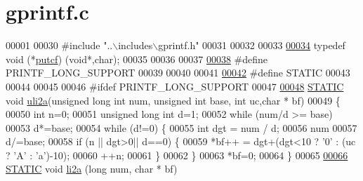 \hypertarget{a00043_source}{\section{gprintf.\+c}
\label{a00043_source}
}

\begin{DoxyCode}
00001 
00030 \textcolor{preprocessor}{#include "..\(\backslash\)includes\(\backslash\)gprintf.h"}
00031 
00032 
00033 
\hypertarget{a00043_source_l00034}{}\hyperlink{a00043_aa2de12079c58c63cb0208a0b3df2a0b7}{00034} \textcolor{keyword}{typedef} void (*\hyperlink{a00043_aa2de12079c58c63cb0208a0b3df2a0b7}{putcf}) (\textcolor{keywordtype}{void}*,char);
00035 
00036 
00037 
\hypertarget{a00043_source_l00038}{}\hyperlink{a00043_ac346309c454e31a36e32039d9575ee3e}{00038} \textcolor{preprocessor}{#define PRINTF\_LONG\_SUPPORT}
00039 
00040 
00041 
\hypertarget{a00043_source_l00042}{}\hyperlink{a00043_a10b2d890d871e1489bb02b7e70d9bdfb}{00042} \textcolor{preprocessor}{#define STATIC }
00043 
00044 
00045 
00046 \textcolor{preprocessor}{#ifdef PRINTF\_LONG\_SUPPORT}
00047 
\hypertarget{a00043_source_l00048}{}\hyperlink{a00043_ac8448f6a2ace7b25fc6fbd5561fe5e75}{00048} \hyperlink{a00043_a10b2d890d871e1489bb02b7e70d9bdfb}{STATIC} \textcolor{keywordtype}{void} \hyperlink{a00043_ac8448f6a2ace7b25fc6fbd5561fe5e75}{uli2a}(\textcolor{keywordtype}{unsigned} \textcolor{keywordtype}{long} \textcolor{keywordtype}{int} num, \textcolor{keywordtype}{unsigned} \textcolor{keywordtype}{int} base, \textcolor{keywordtype}{int} uc,\textcolor{keywordtype}{char} * bf)
00049     \{
00050     \textcolor{keywordtype}{int} n=0;
00051     \textcolor{keywordtype}{unsigned} \textcolor{keywordtype}{long} \textcolor{keywordtype}{int} d=1;
00052     \textcolor{keywordflow}{while} (num/d >= base)
00053         d*=base;         
00054     \textcolor{keywordflow}{while} (d!=0) \{
00055         \textcolor{keywordtype}{int} dgt = num / d;
00056         num%
00057         d/=base;
00058         \textcolor{keywordflow}{if} (n || dgt>0|| d==0) \{
00059             *bf++ = dgt+(dgt<10 ? \textcolor{charliteral}{'0'} : (uc ? \textcolor{charliteral}{'A'} : \textcolor{charliteral}{'a'})-10);
00060             ++n;
00061             \}
00062         \}
00063     *bf=0;
00064     \}
00065 
\hypertarget{a00043_source_l00066}{}\hyperlink{a00043_a3e55a1e7928695ff7713544a808c3fce}{00066} \hyperlink{a00043_a10b2d890d871e1489bb02b7e70d9bdfb}{STATIC} \textcolor{keywordtype}{void} \hyperlink{a00043_a3e55a1e7928695ff7713544a808c3fce}{li2a} (\textcolor{keywordtype}{long} num, \textcolor{keywordtype}{char} * bf)

\end{DoxyCode}
